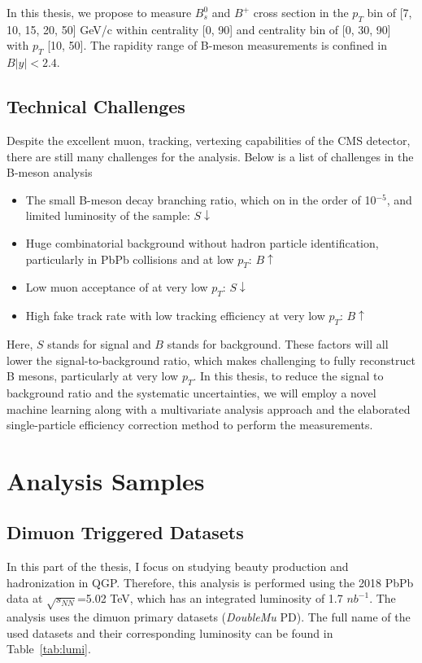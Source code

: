 In this thesis, we propose to measure $B^0_s$ and $B^+$ cross section in the $p_T$ bin of [7, 10, 15, 20, 50] GeV/c within centrality [0, 90] and centrality bin of [0, 30, 90] with $p_T$ [10, 50]. The rapidity range of B-meson measurements is confined in $B |y| < 2.4$.

\subsection{Technical Challenges}

Despite the excellent muon, tracking, vertexing capabilities of the CMS detector, there are still many challenges for the analysis. Below is a list of challenges in the B-meson analysis 

\begin{itemize}
\item The small B-meson decay branching ratio, which on in the order of 10$^{-5}$, and limited luminosity of the sample: $S \downarrow$ 
\item Huge combinatorial background without hadron particle identification, particularly in PbPb collisions and at low $p_T$:  $B \uparrow$ 
\item Low muon acceptance of at very low $p_T$: $S \downarrow$ 
\item High fake track rate with low tracking efficiency at very low $p_T$: $B \uparrow$ 
\end{itemize}

Here, $S$ stands for signal and $B$ stands for background. These factors will all lower the signal-to-background ratio, which makes challenging to fully reconstruct B mesons, particularly at very low $p_T$. In this thesis, to reduce the signal to background ratio and the systematic uncertainties, we will employ a novel machine learning along with a multivariate analysis approach and the elaborated single-particle efficiency correction method to perform the measurements.


\section{Analysis Samples}


\subsection{Dimuon Triggered Datasets}

In this part of the thesis, I focus on studying beauty production and hadronization in QGP. Therefore, this analysis is performed using the 2018 PbPb data at $\sqrt{s_{NN}}$=5.02 TeV, which has an integrated luminosity of 1.7 $nb^{-1}$. 
The analysis uses the dimuon primary datasets (\textit{DoubleMu} PD). The full name of the used datasets and their corresponding luminosity can be found in Table~\ref{tab:lumi}.

